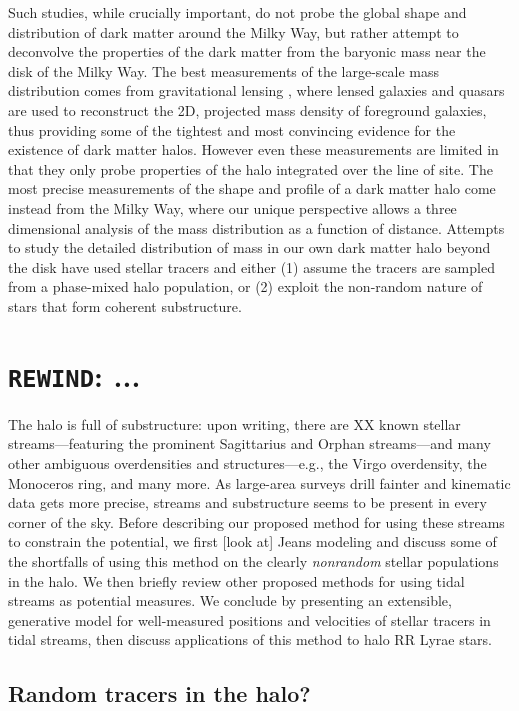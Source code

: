 \documentclass[letterpaper,12pt,preprint]{aastex}
\begin{document}
Such studies, while crucially important, do not probe the global shape and distribution of dark matter around the Milky Way, but rather attempt to deconvolve the properties of the dark matter from the baryonic mass near the disk of the Milky Way. The best measurements of the large-scale mass distribution comes from gravitational lensing \citep[e.g.,][]{}, where lensed galaxies and quasars are used to reconstruct the 2D, projected mass density of foreground galaxies, thus providing some of the tightest and most convincing evidence for the existence of dark matter halos. However even these measurements are limited in that they only probe properties of the halo integrated over the line of site. The most precise measurements of the shape and profile of a dark matter halo come instead from the Milky Way, where our unique perspective allows a three dimensional analysis of the mass distribution as a function of distance. Attempts to study the detailed distribution of mass in our own dark matter halo beyond the disk have used stellar tracers and either (1) assume the tracers are sampled from a phase-mixed halo population, or (2) exploit the non-random nature of stars that form coherent substructure. 

\section{\texttt{REWIND}: ...}

The halo is full of substructure: upon writing, there are XX known stellar streams---featuring the prominent Sagittarius and Orphan streams---and many other ambiguous overdensities and structures---e.g., the Virgo overdensity, the Monoceros ring, and many more. As large-area surveys drill fainter and kinematic data gets more precise, streams and substructure seems to be present in every corner of the sky. Before describing our proposed method for using these streams to constrain the potential, we first [look at] Jeans modeling and discuss some of the shortfalls of using this method on the clearly \emph{nonrandom} stellar populations in the halo. We then briefly review other proposed methods for using tidal streams as potential measures. We conclude by presenting an extensible, generative model for well-measured positions and velocities of stellar tracers in tidal streams, then discuss applications of this method to halo RR Lyrae stars.

\subsection{Random tracers in the halo?}
\end{document}
